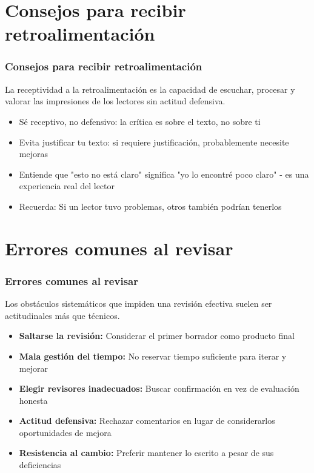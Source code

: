 \documentclass{beamer}
\begin{document}
\section{Consejos para recibir retroalimentación}
\begin{frame}
\frametitle{Consejos para recibir retroalimentación}

\textbf{} La receptividad a la retroalimentación es la capacidad de escuchar, procesar y valorar las impresiones de los lectores sin actitud defensiva.

\vspace{0.3cm}
\begin{itemize}
\item Sé receptivo, no defensivo: la crítica es sobre el texto, no sobre ti
\item Evita justificar tu texto: si requiere justificación, probablemente necesite mejoras
\item Entiende que "esto no está claro" significa "yo lo encontré poco claro" - es una experiencia real del lector
\item Recuerda: Si un lector tuvo problemas, otros también podrían tenerlos
\end{itemize}
\end{frame}
\section{Errores comunes al revisar}
\begin{frame}
\frametitle{Errores comunes al revisar}

\textbf{} Los obstáculos sistemáticos que impiden una revisión efectiva suelen ser actitudinales más que técnicos.

\vspace{0.3cm}
\begin{itemize}
\item \textbf{Saltarse la revisión:} Considerar el primer borrador como producto final
\item \textbf{Mala gestión del tiempo:} No reservar tiempo suficiente para iterar y mejorar
\item \textbf{Elegir revisores inadecuados:} Buscar confirmación en vez de evaluación honesta
\item \textbf{Actitud defensiva:} Rechazar comentarios en lugar de considerarlos oportunidades de mejora
\item \textbf{Resistencia al cambio:} Preferir mantener lo escrito a pesar de sus deficiencias
\end{itemize}
\end{frame}
\end{document}
